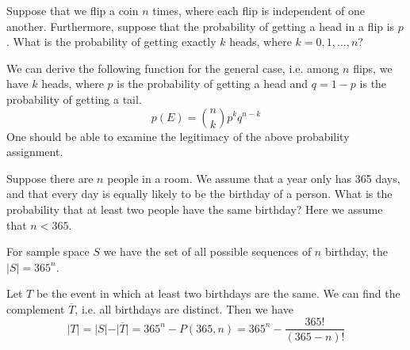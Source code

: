 \newpage
\begin{eg}
    Suppose that we flip a coin \(n\) times, where each flip is independent of one another. Furthermore, suppose that the probability of getting a head in a flip is \(p\). What is the probability of getting exactly \(k\) heads, where \(k = 0, 1, \dots, n\)?

    We can derive the following function for the general case, i.e. among \(n\) flips, we have \(k\) heads, where \(p\) is the probability of getting a head and \(q = 1 - p\) is the probability of getting a tail.
    \[
        p(E) = \binom{n}{k}p^k q^{n-k} 
    \]
    One should be able to examine the legitimacy of the above probability assignment.
\end{eg}

\begin{eg}
    Suppose there are \(n\) people in a room. We assume that a year only has 365 days, and that every day is equally likely to be the birthday of a person. What is the probability that at least two people have the same birthday? Here we assume that \(n < 365\). 

    For sample space \(S\) we have the set of all possible sequences of \(n\) birthday, the \(\vert S \vert = 365^n\). 
    
    Let \(T\) be the event in which at least two birthdays are the same. We can find the complement \(\overline{T}\), i.e. all birthdays are distinct. Then we have
    \[
        \vert T \vert = \vert S \vert - \vert \overline{T} \vert = 365^n - P(365, n) = 365^n - \dfrac{365!}{(365 - n)!}
    \]
\end{eg}

